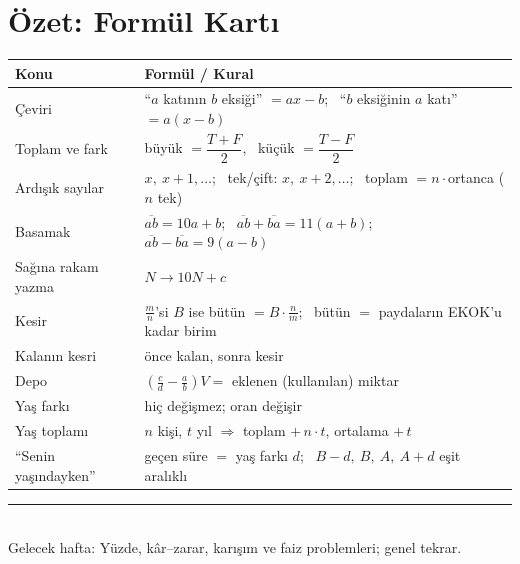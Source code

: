 \documentclass[11pt,a4paper]{article}
\newcounter{alis}
\newcommand{\ab}[1]{\overline{#1}}
\begin{document}
\section{Özet: Formül Kartı}
\begin{center}
\renewcommand{\arraystretch}{1.6}
\begin{tabular}{@{}ll@{}}
\toprule
Konu & Formül / Kural\\\midrule
Çeviri & ``\(a\) katının \(b\) eksiği'' \(=ax-b\); \ ``\(b\) eksiğinin \(a\) katı'' \(=a(x-b)\)\\
Toplam ve fark & büyük \(=\dfrac{T+F}{2}\), \ küçük \(=\dfrac{T-F}{2}\)\\
Ardışık sayılar & \(x,\ x+1,\dots\); \ tek/çift: \(x,\ x+2,\dots\); \ toplam \(=n\cdot\)ortanca (\(n\) tek)\\
Basamak & \(\ab{ab}=10a+b\); \ \(\ab{ab}+\ab{ba}=11(a+b)\); \ \(\ab{ab}-\ab{ba}=9(a-b)\)\\
Sağına rakam yazma & \(N\to 10N+c\)\\
Kesir & \(\frac{m}{n}\)'si \(B\) ise bütün \(=B\cdot\frac{n}{m}\); \ bütün \(=\) paydaların EKOK'u kadar birim\\
Kalanın kesri & önce kalan, sonra kesir\\
Depo & \(\left(\frac{c}{d}-\frac{a}{b}\right)V=\) eklenen (kullanılan) miktar\\
Yaş farkı & hiç değişmez; oran değişir\\
Yaş toplamı & \(n\) kişi, \(t\) yıl \(\Rightarrow\) toplam \(+\,n\cdot t\), ortalama \(+\,t\)\\
``Senin yaşındayken'' & geçen süre \(=\) yaş farkı \(d\); \ \(B-d,\ B,\ A,\ A+d\) eşit aralıklı\\\bottomrule
\end{tabular}
\end{center}

\newpage


\vspace{6pt}
\noindent\textcolor{anamavi}{\rule{\textwidth}{0.5pt}}\\
{\small Gelecek hafta: Yüzde, kâr--zarar, karışım ve faiz problemleri; genel tekrar.}
\end{document}
